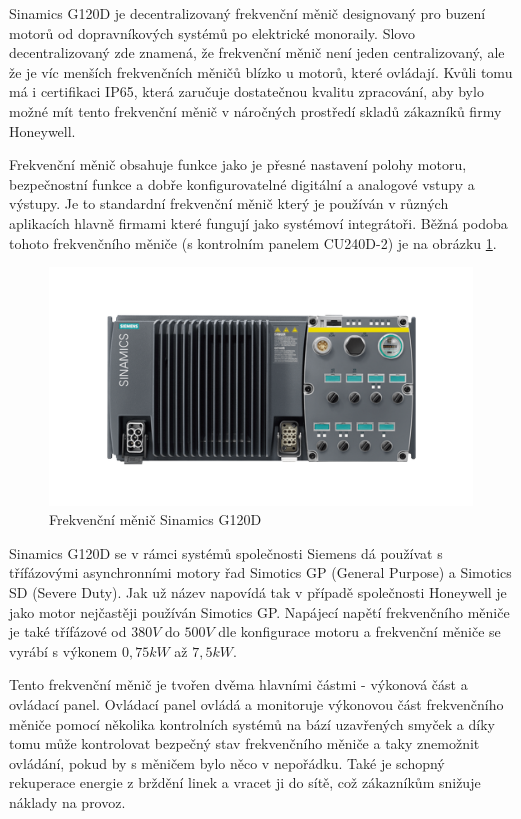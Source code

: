 Sinamics G120D je decentralizovaný frekvenční měnič designovaný pro buzení motorů od dopravníkových systémů po elektrické monoraily. Slovo decentralizovaný zde znamená, že frekvenční měnič není jeden centralizovaný, ale že je víc menších frekvenčních měničů blízko u motorů, které ovládají. Kvůli tomu má i certifikaci IP65, která zaručuje dostatečnou kvalitu zpracování, aby bylo možné mít tento frekvenční měnič v náročných prostředí skladů zákazníků firmy Honeywell.
\cite{SinamicsG120D}

Frekvenční měnič obsahuje funkce jako je přesné nastavení polohy motoru, bezpečnostní funkce a dobře konfigurovatelné digitální a analogové vstupy a výstupy. Je to standardní frekvenční měnič který je používán v různých aplikacích hlavně firmami které fungují jako systémoví integrátoři. Běžná podoba tohoto frekvenčního měniče (s kontrolním panelem CU240D-2) je na obrázku \ref{fig:sinamics_G120D}.
\cite{SinamicsG120D}

\begin{figure}[hptb]
	\centering
	\includegraphics[width=0.8\linewidth]{images/Sinamics_G120D.png}
	\caption{Frekvenční měnič Sinamics G120D \cite{SinamicsG120D}}
	\label{fig:sinamics_G120D}
\end{figure}

Sinamics G120D se v rámci systémů společnosti Siemens dá používat s třífázovými asynchronními motory řad Simotics GP (General Purpose) a Simotics SD (Severe Duty). Jak už název napovídá tak v případě společnosti Honeywell je jako motor nejčastěji používán Simotics GP. Napájecí napětí frekvenčního měniče je také třífázové od $380V$ do  $500V$ dle konfigurace motoru a frekvenční měniče se vyrábí s výkonem $0,75kW$ až $7,5kW$.

Tento frekvenční měnič je tvořen dvěma hlavními částmi - výkonová část a ovládací panel. Ovládací panel ovládá a monitoruje výkonovou část frekvenčního měniče pomocí několika kontrolních systémů na bází uzavřených smyček a díky tomu může kontrolovat bezpečný stav frekvenčního měniče a taky znemožnit ovládání, pokud by s měničem bylo něco v nepořádku. Také je schopný rekuperace energie z brždění linek a vracet ji do sítě, což zákazníkům snižuje náklady na provoz.
\cite{SinamicsG120D}

